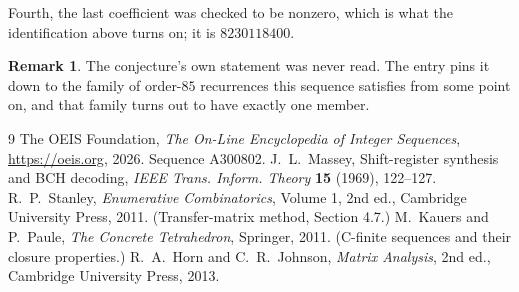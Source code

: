 \documentclass[11pt,a4paper]{article}
\theoremstyle{plain}
\theoremstyle{definition}
\newtheorem{remark}[theorem]{Remark}
\begin{document}
Fourth, the last coefficient was checked to be nonzero, which is what the identification above
turns on; it is $8230118400$.

\begin{remark}
The conjecture's own statement was never read. The entry pins it down to the family of
order-$85$ recurrences this sequence satisfies from some point on, and that family turns
out to have exactly one member.
\end{remark}

\begin{thebibliography}{9}
 The OEIS Foundation, \emph{The On-Line Encyclopedia of Integer
Sequences}, \url{https://oeis.org}, 2026. Sequence A300802.
 J.~L.~Massey, Shift-register synthesis and BCH decoding, \emph{IEEE
Trans. Inform. Theory} \textbf{15} (1969), 122--127.
 R.~P.~Stanley, \emph{Enumerative Combinatorics}, Volume 1, 2nd ed.,
Cambridge University Press, 2011. (Transfer-matrix method, Section 4.7.)
 M.~Kauers and P.~Paule, \emph{The Concrete Tetrahedron}, Springer, 2011.
(C-finite sequences and their closure properties.)
 R.~A.~Horn and C.~R.~Johnson, \emph{Matrix Analysis}, 2nd ed., Cambridge
University Press, 2013.
\end{thebibliography}
\end{document}
